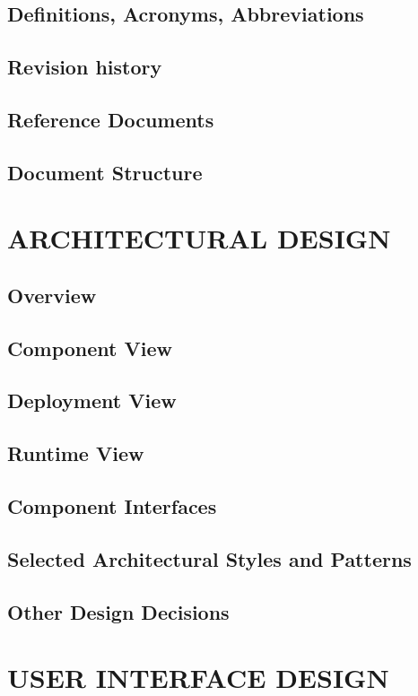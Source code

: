 \documentclass[a4paper,12pt]{report}
\begin{document}
\section{Definitions, Acronyms, Abbreviations}
\section{Revision history}
\section{Reference Documents}
\section{Document Structure}



\chapter{ARCHITECTURAL DESIGN}
\section{Overview}
\section{Component View}
\section{Deployment View}
\section{Runtime View}
\section{Component Interfaces}
\section{Selected Architectural Styles and Patterns}
\section{Other Design Decisions}

\chapter{USER INTERFACE DESIGN}
\end{document}
